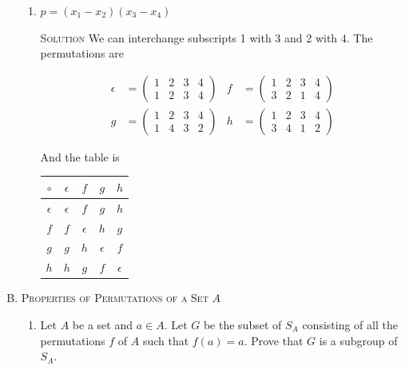 \documentclass[twoside]{amsart}
\newcommand{\solution}{\textsc{Solution}\xspace}
\newcommand{\eps}{\ensuremath{\epsilon}\xspace}
\begin{document}
\begin{enumerate}[A.]
\begin{enumerate}[1]
      \item $p=(x_1-x_2)(x_3-x_4)$
     
      \noindent \solution We can interchange subscripts 1 with 3 and 2 with 4.
      The permutations are

      \begin{align*}
         \eps &= \begin{pmatrix}
	            1 & 2 & 3 & 4 \\
	            1 & 2 & 3 & 4 
		 \end{pmatrix}
		 &
	 f    &= \begin{pmatrix}
	            1 & 2 & 3 & 4 \\
		    3 & 2 & 1 & 4 
		 \end{pmatrix}
		 \\
	 g    &= \begin{pmatrix}
	            1 & 2 & 3 & 4 \\
		    1 & 4 & 3 & 2
		 \end{pmatrix}
		 &
	 h    &= \begin{pmatrix}
	            1 & 2 & 3 & 4 \\
		    3 & 4 & 1 & 2
		 \end{pmatrix}
      \end{align*}

      And the table is

      \vspace{5pt}
      \begin{center}
      \begin{tabular}{c|cccc}
         $\circ$ & $\eps$ & $f$ & $g$ & $h$ \\ \hline
	 $\eps$  & $\eps$ & $f$ & $g$ & $h$ \\
	 $f$     & $f$ & $\eps$ & $h$ & $g$ \\
	 $g$     & $g$ & $h$ & $\eps$ & $f$ \\
	 $h$     & $h$ & $g$ & $f$ & $\eps$
      \end{tabular}
      \end{center}

   \end{enumerate}

   \item \textsc{Properties of Permutations of a Set} $A$

      \begin{enumerate}[1]
         \item Let $A$ be a set and $a \in A$. Let $G$ be the subset of
	 $S_A$ consisting of all the permutations $f$ of $A$ such that
	 $f(a)=a$. Prove that $G$ is a subgroup of $S_A$.


\end{enumerate}
\end{enumerate}
\end{document}
